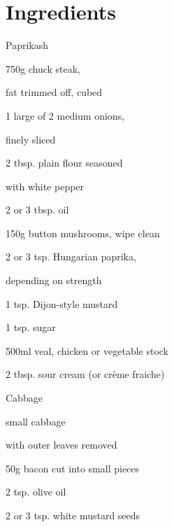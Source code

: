 \section*{Ingredients}
Paprikash
\begin{ingredients-list}
	\item 750g chuck steak,
	\item fat trimmed off, cubed
	\item 1 large of 2 medium onions,
	\item finely sliced
	\item 2 tbsp. plain flour seasoned
	\item with white pepper
	\item 2 or 3 tbsp. oil
	\item 150g button mushrooms, wipe clean
	\item 2 or 3 tsp. Hungarian paprika,
	\item depending on strength
	\item 1 tsp. Dijon-style mustard
	\item 1 tsp. sugar
	\item 500ml veal, chicken or vegetable stock
	\item 2 tbsp. sour cream (or crème fraiche)
\end{ingredients-list}
Cabbage
\begin{ingredients-list}
	\item {} small cabbage
	\item with outer leaves removed
	\item 50g bacon cut into small pieces
	\item 2 tsp. olive oil
	\item 2 or 3 tsp. white mustard seeds
\end{ingredients-list}

